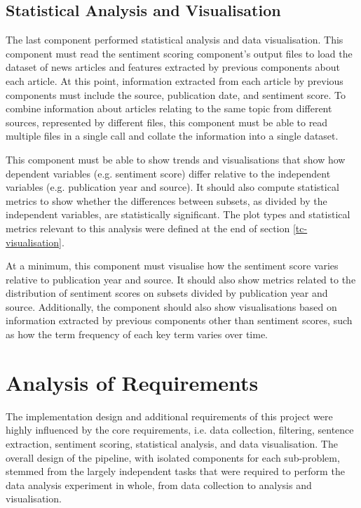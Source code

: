 \documentclass{report}
\begin{document}
\subsection{Statistical Analysis and Visualisation} \label{req-visualisation}

The last component performed statistical analysis and data visualisation.
This component must read the sentiment scoring component's output files to load the dataset of news articles and features extracted by previous components about each article.
At this point, information extracted from each article by previous components must include the source, publication date, and sentiment score.
To combine information about articles relating to the same topic from different sources, represented by different files, this component must be able to read multiple files in a single call and collate the information into a single dataset.

This component must be able to show trends and visualisations that show how dependent variables (e.g. sentiment score) differ relative to the independent variables (e.g. publication year and source).
It should also compute statistical metrics to show whether the differences between subsets, as divided by the independent variables, are statistically significant.
The plot types and statistical metrics relevant to this analysis were defined at the end of section \ref{tc-visualisation}.

At a minimum, this component must visualise how the sentiment score varies relative to publication year and source.
It should also show metrics related to the distribution of sentiment scores on subsets divided by publication year and source.
Additionally, the component should also show visualisations based on information extracted by previous components other than sentiment scores, such as how the term frequency of each key term varies over time.


\section{Analysis of Requirements} \label{Analysis of Requirements}

The implementation design and additional requirements of this project were highly influenced by the core requirements, i.e. data collection, filtering, sentence extraction, sentiment scoring, statistical analysis, and data visualisation.
The overall design of the pipeline, with isolated components for each sub-problem, stemmed from the largely independent tasks that were required to perform the data analysis experiment in whole, from data collection to analysis and visualisation.
\end{document}
